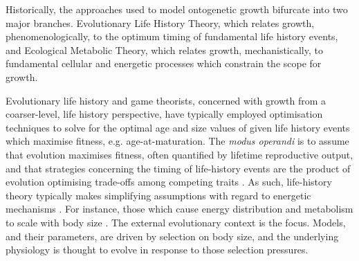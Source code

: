 \documentclass[a4paper]{article} %
\begin{document}
    Historically, the approaches used to model ontogenetic growth bifurcate into two major branches. Evolutionary Life History Theory, which relates growth, phenomenologically, to the optimum timing of fundamental life history events, and Ecological Metabolic Theory, which relates growth, mechanistically, to fundamental cellular and energetic processes which constrain the scope for growth.
        
    Evolutionary life history and game theorists, concerned with growth from a coarser-level, life history perspective, have typically employed optimisation techniques to solve for the optimal age and size values of given life history events which maximise fitness, e.g. age-at-maturation. The \textit{modus operandi} is to assume that evolution maximises fitness, often quantified by lifetime reproductive output, and that strategies concerning the timing of life-history events are the product of evolution optimising trade-offs among competing traits \autocite{Day1997, Stearns1989, stearns1992evolution}. As such, life-history theory typically makes simplifying assumptions with regard to energetic mechanisms \autocite{Day1997, Kozowski1987-indeterminate}. For instance, those which cause energy distribution and metabolism to scale with body size \autocite{peters1983,Werner1988,West1997,brown2000-scaling-book}. The external evolutionary context is the focus. Models, and their parameters, are driven by selection on body size, and the underlying physiology is thought to evolve in response to those selection pressures.
        
\end{document}
